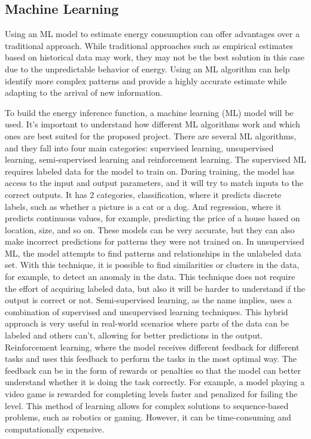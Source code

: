 \documentclass[sigplan]{acmart}
\begin{document}
\subsection{Machine Learning} \label{sec:background_machine_learning}

Using an ML model to estimate energy consumption can offer advantages over a traditional approach. While traditional approaches such as empirical estimates based on historical data may work, they may not be the best solution in this case due to the unpredictable behavior of energy. Using an ML algorithm can help identify more complex patterns and provide a highly accurate estimate while adapting to the arrival of new information.

To build the energy inference function, a machine learning (ML) model will be used. It's important to understand how different ML algorithms work and which ones are best suited for the proposed project. There are several ML algorithms, and they fall into four main categories\cite{sarker2021machine}: supervised learning, unsupervised learning, semi-supervised learning and reinforcement learning.
The supervised ML requires labeled data for the model to train on. During training, the model has access to the input and output parameters, and it will try to match inputs to the correct outputs. It has 2 categories, classification, where it predicts discrete labels, such as whether a picture is a cat or a dog. And regression, where it predicts continuous values, for example, predicting the price of a house based on location, size, and so on. These models can be very accurate, but they can also make incorrect predictions for patterns they were not trained on.
In unsupervised ML, the model attempts to find patterns and relationships in the unlabeled data set. With this technique, it is possible to find similarities or clusters in the data, for example, to detect an anomaly in the data. This technique does not require the effort of acquiring labeled data, but also it will be harder to understand if the output is correct or not.
Semi-supervised learning, as the name implies, uses a combination of supervised and unsupervised learning techniques. This hybrid approach is very useful in real-world scenarios where parts of the data can be labeled and others can't, allowing for better predictions in the output.
Reinforcement learning, where the model receives different feedback for different tasks and uses this feedback to perform the tasks in the most optimal way. The feedback can be in the form of rewards or penalties so that the model can better understand whether it is doing the task correctly. For example, a model playing a video game is rewarded for completing levels faster and penalized for failing the level. This method of learning allows for complex solutions to sequence-based problems, such as robotics or gaming. However, it can be time-consuming and computationally expensive.
\end{document}
